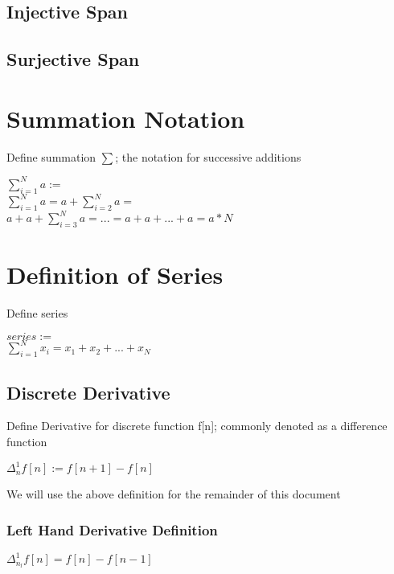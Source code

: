 \documentclass[11pt]{article}
\begin{document}
\subsection{Injective Span}
\subsection{Surjective Span}




\section{Summation Notation}
Define summation $\sum$; the notation for successive additions
\begin{center}
$\sum_{i=1}^{N} a :=$
\\ \vspace{2mm}
$\sum_{i=1}^{N} a = a + \sum_{i=2}^{N} a =$
\\ \vspace{2mm}
$a + a + \sum_{i=3}^{N} a = ... = a + a + ... + a = a * N$
\end{center}




\section{Definition of Series}
Define series
\begin{center}
$series :=$
\\ \vspace{2mm}
$\sum_{i=1}^{N} x_i = x_1 + x_2 + ... + x_N$
\end{center}






\subsection{Discrete Derivative}
Define Derivative for discrete function f[n]; commonly denoted as a difference function
\begin{center}
$
\Delta_n^1 f[n] := f[n+1] - f[n]
$
\end{center}
\vspace{1mm}
We will use the above definition for the remainder of this document \\


\subsubsection{Left Hand Derivative Definition}
\begin{center}
\vspace{1mm}
$
\Delta_{n_l}^1 f[n] = f[n] - f[n-1]
$
\end{center}
\end{document}
